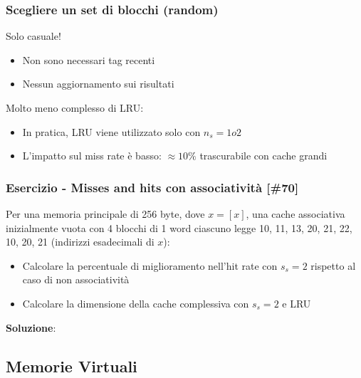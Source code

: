 \documentclass[12pt,a4paper]{article}
\begin{document}
\subsubsection{Scegliere un set di blocchi (random)}
Solo casuale!
\begin{itemize}
\item Non sono necessari tag recenti
\item Nessun aggiornamento sui risultati
\end{itemize}
Molto meno complesso di LRU:
\begin{itemize}
\item In pratica, LRU viene utilizzato solo con $n_s=1 o 2$
\item L'impatto sul miss rate è basso: $\approx 10 \%$ trascurabile con cache grandi
\end{itemize}

\subsubsection{Esercizio - Misses and hits con associatività [\#70]}
Per una memoria principale di 256 byte, dove $x=[x]$, una cache associativa inizialmente vuota con 4 blocchi di 1 word ciascuno legge 10, 11, 13, 20, 21, 22, 10, 20, 21 (indirizzi esadecimali di $x$):
\begin{itemize}
\item Calcolare la percentuale di miglioramento nell'hit rate con $s_s=2$ rispetto al caso di non associatività
\item Calcolare la dimensione della cache complessiva con $s_s=2$ e LRU
\end{itemize}
\textbf{Soluzione}:

\subsection{Memorie Virtuali}

\end{document}

